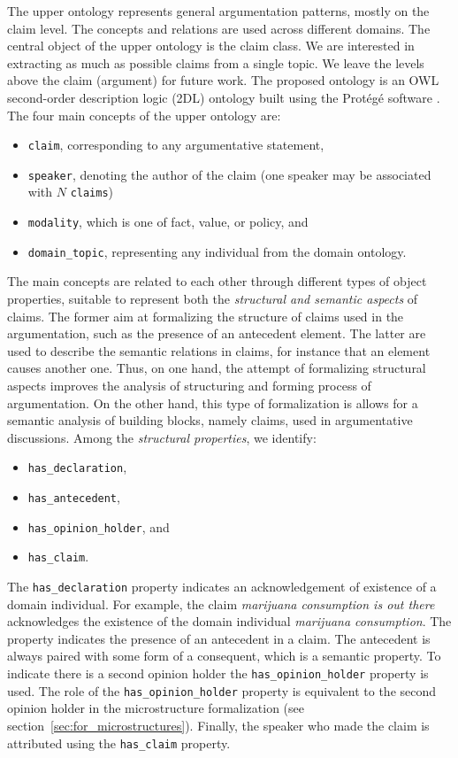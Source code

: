 The upper ontology represents general argumentation patterns, mostly on the claim level. 
The concepts and relations are used across different domains. 
The central object of the upper ontology is the claim class.
We are interested in extracting as much as possible claims from a single topic. 
We leave the levels above the claim (argument) for future work. The proposed
ontology is an OWL second-order description logic (2DL) ontology built using the
Prot\'{e}g\'{e} software \citep{gennari2003evolution}. The four main concepts of the
upper ontology are:
\begin{itemize}
	\item \texttt{claim}, corresponding to any argumentative statement,
	\item \texttt{speaker},  denoting the author of the claim
		(one speaker may be associated with $N$ \texttt{claims})
	\item \texttt{modality}, which is one of fact, value, or policy, and
	\item \texttt{domain\_topic}, representing any individual from the domain ontology.
\end{itemize}

The main concepts are related to each other through different types of object
properties, suitable to represent both the \emph{structural and semantic aspects} of
claims. The former aim at formalizing the structure of claims used in
the argumentation, such as the presence of an antecedent element. The latter
are used to describe the semantic relations in claims, for instance that
an element causes another one. Thus, on one hand, the attempt of 
formalizing structural aspects improves the analysis of structuring and
forming process of argumentation. On the other hand, this type of formalization
is allows for a semantic analysis of building blocks, namely claims, used in 
argumentative discussions. Among the \emph{structural properties}, we identify:
\begin{itemize}
\item \texttt{has\_declaration}, 
\item \texttt{has\_antecedent},
\item \texttt{has\_opinion\_holder}, and
\item \texttt{has\_claim}. 
\end{itemize}
The \texttt{has\_declaration} property indicates an acknowledgement of
existence of a domain individual. For example, the claim 
\emph{marijuana consumption is out there} acknowledges
the existence of the domain individual \emph{marijuana consumption}.
The  property indicates the presence of an 
antecedent in a claim. The antecedent is always paired with some
form of a consequent, which is a semantic property. To indicate
there is a second opinion holder the \texttt{has\_opinion\_holder}
property is used. The role of the \texttt{has\_opinion\_holder}
property is equivalent to the second opinion holder in the microstructure
formalization (see section~\ref{sec:for_microstructures}). Finally, the speaker
who made the claim is attributed using the \texttt{has\_claim} property.

